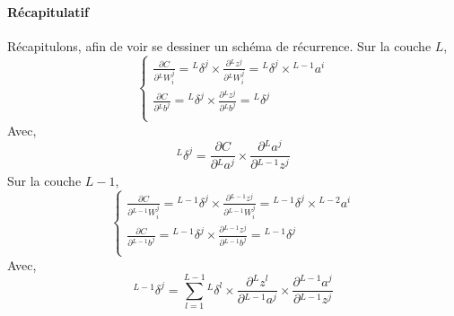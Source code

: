 \documentclass[a4paper, 11pt]{report}
\newcommand{\lexp}[1]{\phantom{}^{#1}}
\newcommand{\elem}[4]{\lexp{#2}#1^{#3}_{#4}}
\begin{document}
\paragraph{Récapitulatif}
Récapitulons, afin de voir se dessiner un schéma de récurrence.
Sur la couche $L$,
$$\left\{
\begin{array}{l}
	\frac{\partial C}{\partial \elem{W}{L}{j}{i}} = \elem{\delta}{L}{j}{} \times \frac{\partial \elem{z}{L}{j}{}}{\partial \elem{W}{L}{j}{i}} = \elem{\delta}{L}{j}{} \times \elem{a}{L-1}{i}{} 
	\\                                                                                                                                                                                        
	                                                                                                                                                                                            
	\frac{\partial C}{\partial \elem{b}{L}{j}{}} = \elem{\delta}{L}{j}{} \times \frac{\partial \elem{z}{L}{j}{}}{\partial \elem{b}{L}{j}{}} = \elem{\delta}{L}{j}{}                             
	\\                                                                                                                                                                                        
\end{array}
\right.$$
Avec,
$$\elem{\delta}{L}{j}{} = \frac{\partial C}{\partial \elem{a}{L}{j}{}} \times \frac{\partial \elem{a}{L}{j}{}}{\partial \elem{z}{L-1}{j}{}}$$
Sur la couche $L-1$,
$$\left\{
\begin{array}{l}
	\frac{\partial C}{\partial \elem{W}{L-1}{j}{i}} = \elem{\delta}{L-1}{j}{} \times \frac{\partial \elem{z}{L-1}{j}{}}{\partial \elem{W}{L-1}{j}{i}} = \elem{\delta}{L-1}{j}{} \times \elem{a}{L-2}{i}{} 
	\\                                                                                                                                                                                                  
	\frac{\partial C}{\partial \elem{b}{L-1}{j}{}} = \elem{\delta}{L-1}{j}{} \times \frac{\partial \elem{z}{L-1}{j}{}}{\partial \elem{b}{L-1}{j}{}} = \elem{\delta}{L-1}{j}{}                             
	\\                                                                                                                                                                                                  
\end{array}
\right.$$
Avec,
$$\elem{\delta}{L-1}{j}{} = \sum_{l=1}^{L-1}{\elem{\delta}{L}{l}{} \times \frac{\partial \elem{z}{L}{l}{}}{\partial \elem{a}{L-1}{j}{}}} \times \frac{\partial \elem{a}{L-1}{j}{}}{\partial \elem{z}{L-1}{j}{}}$$
\end{document}
